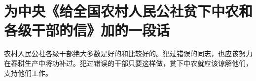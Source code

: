 \section[为中央《给全国农村人民公社贫下中农和各级干部的信》加的一段话（一九六七年二月二十日）]{为中央《给全国农村人民公社贫下中农和各级干部的信》加的一段话}


农村人民公社各级干部绝大多数是好的和比较好的。犯过错误的同志，也应该努力在春耕生产中将功补过。犯过错误的干部只要这样做，贫下中农就应该谅解他们，支持他们工作。

